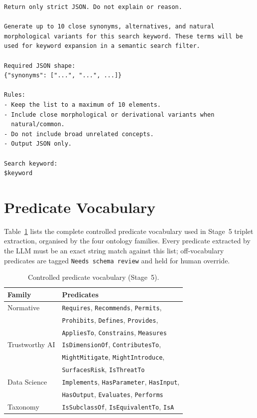 \begin{lstlisting}[language={},breaklines=true,caption={},numbers=none,xleftmargin=0pt]
Return only strict JSON. Do not explain or reason.

Generate up to 10 close synonyms, alternatives, and natural
morphological variants for this search keyword. These terms will be
used for keyword expansion in a semantic search filter.

Required JSON shape:
{"synonyms": ["...", "...", ...]}

Rules:
- Keep the list to a maximum of 10 elements.
- Include close morphological or derivational variants when
  natural/common.
- Do not include broad unrelated concepts.
- Output JSON only.

Search keyword:
$keyword
\end{lstlisting}

\section{Predicate Vocabulary}
\label{app:predicates}

Table~\ref{tab:predicates} lists the complete controlled predicate
vocabulary used in Stage~5 triplet extraction, organised by the four
ontology families.  Every predicate extracted by the LLM must be an
exact string match against this list; off-vocabulary predicates are
tagged \texttt{Needs schema review} and held for human override.

\begin{table}[h]
\centering
\small
\caption{Controlled predicate vocabulary (Stage~5).}
\label{tab:predicates}
\begin{tabular}{ll}
\toprule
\textbf{Family} & \textbf{Predicates} \\
\midrule
Normative
  & \texttt{Requires}, \texttt{Recommends}, \texttt{Permits},\\
  & \texttt{Prohibits}, \texttt{Defines}, \texttt{Provides},\\
  & \texttt{AppliesTo}, \texttt{Constrains}, \texttt{Measures} \\[4pt]
Trustworthy AI
  & \texttt{IsDimensionOf}, \texttt{ContributesTo},\\
  & \texttt{MightMitigate}, \texttt{MightIntroduce},\\
  & \texttt{SurfacesRisk}, \texttt{IsThreatTo} \\[4pt]
Data Science
  & \texttt{Implements}, \texttt{HasParameter}, \texttt{HasInput},\\
  & \texttt{HasOutput}, \texttt{Evaluates}, \texttt{Performs} \\[4pt]
Taxonomy
  & \texttt{IsSubclassOf}, \texttt{IsEquivalentTo}, \texttt{IsA} \\
\bottomrule
\end{tabular}
\end{table}

